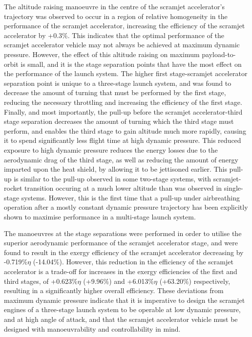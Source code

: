The altitude raising manoeuvre in the centre of the scramjet accelerator's trajectory was observed to occur in a region of relative homogeneity in the performance of the scramjet accelerator, increasing the efficiency of the scramjet accelerator by +0.3\%. This indicates that the optimal performance of the scramjet accelerator vehicle may not always be achieved at maximum dynamic pressure.  
However, the effect of this altitude raising on maximum payload-to-orbit is small, and it is the stage separation points that have the most effect on the performance of the launch system.
The higher first stage-scramjet accelerator separation point is unique to a three-stage launch system, and was found to decrease the amount of turning that must be performed by the first stage,
reducing the necessary throttling and increasing the efficiency of the first stage.
 Finally, and most importantly, the pull-up before the scramjet accelerator-third stage separation decreases the amount of turning which the third stage must perform, and enables the third stage to gain altitude much more rapidly, causing it to spend significantly less flight time at high dynamic pressure. 
This reduced exposure to high dynamic pressure reduces the energy losses due to the aerodynamic drag of the third stage, as well as reducing the amount of energy imparted upon the heat shield, by allowing it to be jettisoned earlier. This pull-up is similar to the pull-up observed in some two-stage systems, with scramjet-rocket transition occuring at a much lower altitude than was observed in single-stage systems. However, this is the first time that a pull-up under airbreathing operation after a mostly constant dynamic pressure trajectory has been explicitly shown to maximise performance in a multi-stage launch system.

The manoeuvres at the stage separations were performed in order to utilise the superior aerodynamic performance of the scramjet accelerator stage, and were found to result in the exergy efficiency of the scramjet accelerator decreasing by -0.719\%$\eta$ (-14.04\%). However, this reduction in the efficiency of the scramjet accelerator is a trade-off for increases in the exergy efficiencies of the first and third stages, of +0.623\%$\eta$ (+9.96\%) and +6.013\%$\eta$ (+63.20\%) respectively, resulting in a significantly higher overall efficiency. These deviations from maximum dynamic pressure indicate that it is imperative to design the scramjet engines of a three-stage launch system to be operable at low dynamic pressure, and at high angle of attack, and that the scramjet accelerator vehicle must be designed with manoeuvrability and controllability in mind.

